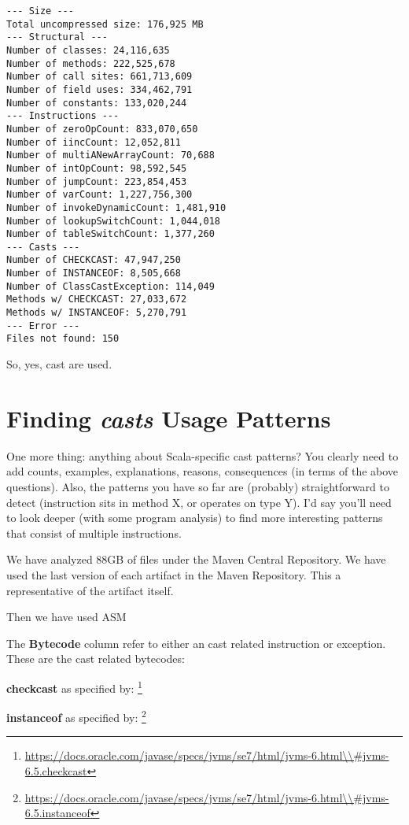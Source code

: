 \begin{verbatim}
--- Size --- 
Total uncompressed size: 176,925 MB 
--- Structural --- 
Number of classes: 24,116,635 
Number of methods: 222,525,678 
Number of call sites: 661,713,609 
Number of field uses: 334,462,791 
Number of constants: 133,020,244 
--- Instructions --- 
Number of zeroOpCount: 833,070,650 
Number of iincCount: 12,052,811 
Number of multiANewArrayCount: 70,688 
Number of intOpCount: 98,592,545 
Number of jumpCount: 223,854,453 
Number of varCount: 1,227,756,300 
Number of invokeDynamicCount: 1,481,910 
Number of lookupSwitchCount: 1,044,018 
Number of tableSwitchCount: 1,377,260 
--- Casts --- 
Number of CHECKCAST: 47,947,250 
Number of INSTANCEOF: 8,505,668 
Number of ClassCastException: 114,049 
Methods w/ CHECKCAST: 27,033,672 
Methods w/ INSTANCEOF: 5,270,791 
--- Error --- 
Files not found: 150 
\end{verbatim}

So, yes, cast are used. 

\section{Finding \emph{casts} Usage Patterns \label{org68b50a1}}
\label{sec:orgcd146e1}

One more thing: anything about Scala-specific cast patterns? 
You clearly need to add counts, examples, explanations, reasons, consequences (in terms of the above questions). 
Also, the patterns you have so far are (probably) straightforward to detect (instruction sits in method X, or operates on type Y). 
I'd say you'll need to look deeper (with some program analysis) to find more interesting patterns that consist of multiple instructions. 

We have analyzed 88GB of  files under the Maven Central Repository. 
We have used the last version of each artifact in the Maven Repository. 
This a representative of the artifact itself. 

Then we have used ASM \cite{Bruneton02asm:a} 

The \textbf{Bytecode} column refer to either an cast related instruction or exception. 
These are the cast related bytecodes: 

\textbf{checkcast} as specified by: 
\footnote{\url{https://docs.oracle.com/javase/specs/jvms/se7/html/jvms-6.html\\\#jvms-6.5.checkcast}} 

\textbf{instanceof} as specified by: 
\footnote{\url{https://docs.oracle.com/javase/specs/jvms/se7/html/jvms-6.html\\\#jvms-6.5.instanceof}} 

